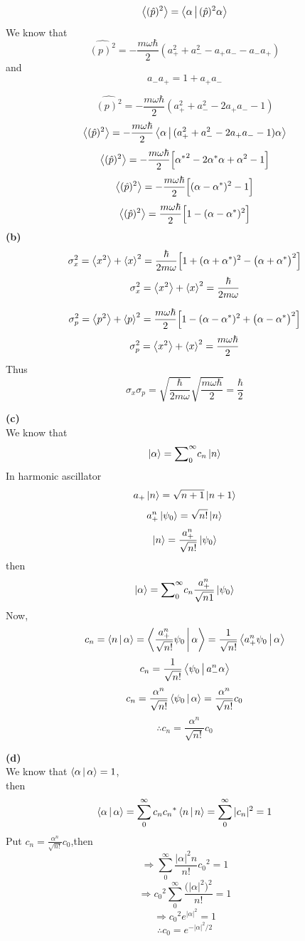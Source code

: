 $$\Braket{(\hat{p})^2}=\Braket{\alpha|(\hat{p})^2\alpha}$$
 We know that$$\hat{(p)^2}={-\frac{m\omega\hbar}{2}}(a_{+}^{2}+a_{-}^{2}-a_{+}a_{-}-a_{-}a_{+})$$
 and$$a_{-}a_{+}=1+a_{+}a_{-}$$

$$\hat{(p)^2}={-\frac{m\omega\hbar}{2}}(a_{+}^{2}+a_{-}^{2}-2a_{+}a_{-}-1)$$
 $$\Braket{(\hat{p})^2}={-\frac{m\omega\hbar}{2}}\Braket{\alpha|(a_{+}^{2}+a_{-}^{2}-2a_{+}a_{-}-1)\alpha}$$
 $$\Braket{(\hat{p})^2}={-\frac{m\omega\hbar}{2}}\Big[{{\alpha}^*}^2-2{\alpha}^*{\alpha}+{\alpha}^2-1\Big]$$
 $$\Braket{(\hat{p})^2}={-\frac{m\omega\hbar}{2}}\Big[({{\alpha}-{\alpha}^*})^2-1\Big]$$
 $$\Braket{(\hat{p})^2}={\frac{m\omega\hbar}{2}}\Big[1-({{\alpha}-{\alpha}^*})^2\Big]$$
\hspace*{3cm}\textbf{(b)} $${\sigma}_{x}^{2}=\Braket{x^2}+{\Braket{x}}^2={\frac{\hbar}{2m\omega}}\Big[1+({{\alpha}+{\alpha}^*})^2-\big(\alpha+{\alpha}^{*}\big)^2\Big]$$ 
  $${\sigma}_{x}^{2}=\Braket{x^2}+{\Braket{x}}^2={\frac{\hbar}{2m\omega}}$$
 
 $${\sigma}_{p}^{2}=\Braket{p^2}+{\Braket{p}}^2={\frac{m\omega\hbar}{2}}\Big[1-({{\alpha}-{\alpha}^*})^2+\big(\alpha-{\alpha}^{*}\big)^2\Big]$$ 
  $${\sigma}_{p}^{2}=\Braket{x^2}+{\Braket{x}}^2={\frac{m\omega\hbar}{2}}$$
  Thus$${\sigma}_{x}{\sigma}_{p}=\sqrt{\frac{\hbar}{2m\omega}}\sqrt{\frac{m\omega\hbar}{2}}=\frac{\hbar}{2}$$
  
  \textbf{(c)} \\
  \hspace*{1cm}We know that
  $$\ket{\alpha}={\sum}_{0}^{\infty}c_{n}\ket{n}$$
  In harmonic ascillator $$a_{+}\ket{n}=\sqrt{n+1}\ket{n+1}$$
  $$a_{+}^{n}\ket{{\psi}_{0}}=\sqrt{n!}\ket{n}$$
  $$\ket{n}=\frac{a_{+}^{n}}{\sqrt{n!}}\ket{{\psi}_{0}}$$
  then\\ $$\ket{\alpha}={\sum}_{0}^{\infty}c_{n}\frac{a_{+}^{n}}{\sqrt{n1}}\ket{{\psi}_{0}}$$
  Now,$$c_{n}=\Braket{n|\alpha}=\Braket{\frac{a_{+}^{n}}{\sqrt{n!}}{\psi}_{0}|\alpha}=\frac{1}{\sqrt{n!}}\Braket{{a_{+}^{n}}{\psi}_{0}|\alpha}$$
  $$c_{n}=\frac{1}{\sqrt{n!}}\Braket{{\psi}_{0}|{a_{-}^{n}}\alpha}$$
  $$c_{n}=\frac{{\alpha}^n}{\sqrt{n!}}\Braket{{\psi}_{0}|\alpha}=\frac{{\alpha}^n}{\sqrt{n!}}c_{0}$$
    $$\therefore c_{n}=\frac{{\alpha}^n}{\sqrt{n!}}c_{0}$$
  
  \textbf{(d)} \\
  \hspace*{1cm}We know that $\Braket{\alpha|\alpha}=1$,\\
  then$$\Braket{\alpha|\alpha}=\sum_{0}^{\infty}c_{n}{c_{n}}^*\Braket{n|n}=\sum_{0}^{\infty}|{c_{n}}|^2=1$$
  Put $c_{n}=\frac{{\alpha}^n}{\sqrt{n!}}c_{0}$,then
  $$\Rightarrow\sum_{0}^{\infty}\frac{|{\alpha}|^2n}{{n!}}{c_{0}}^2=1$$
    $$\Rightarrow {c_{0}}^2 \sum_{0}^{\infty}\frac{\Big(|{\alpha}|^2\Big)^2}{{n!}}=1$$
   $$\Rightarrow {c_{0}}^2 {e}^{{|\alpha|}^2}=1$$
   $$\therefore  {c_{0}}= e^{{-{|\alpha|}^2}/{2}}$$
  
